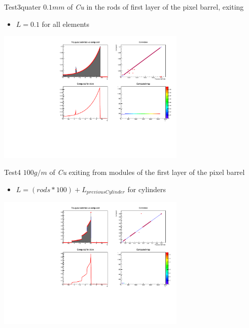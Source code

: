 \documentclass[pdftex, 11pt]{beamer}
\begin{document}
\begin{frame}
  \begin{block}{Test3quater}
    \alert{$0.1 mm$} of \emph{Cu}  in the rods of first layer of the pixel barrel, exiting
    \begin{itemize}
    \item \alert{$L=0.1$} for all elements
    \end{itemize}
  \end{block}
  \begin{center}
    \includegraphics[width=9cm]{img/test3quater.pdf}
  \end{center}
\end{frame}

\begin{frame}
  \begin{block}{Test4}
    \alert{$100 g/m$} of \emph{Cu} exiting from modules of the first layer of the pixel barrel
    \begin{itemize}
    \item \alert{$L=(rods*100) + L_{previousCylinder}$} for cylinders
    \end{itemize}
  \end{block}
  \begin{center}
    \includegraphics[width=9cm]{img/test4.pdf}
  \end{center}
\end{frame}
\end{document}

